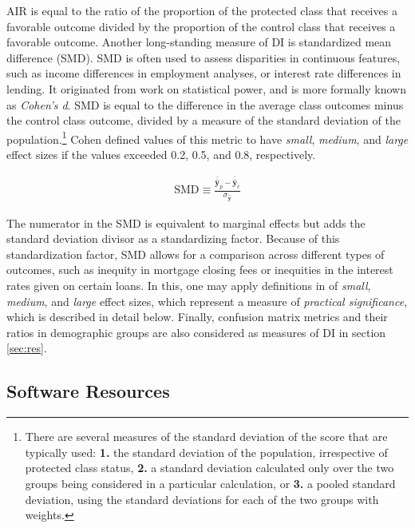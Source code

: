 \documentclass[information,article,submit,moreauthors,pdftex]{definitions/mdpi}
\begin{document}
\noindent AIR is equal to the ratio of the proportion of the protected class that receives a favorable outcome divided by the proportion of the control class that receives a favorable outcome.  Another long-standing measure of DI is standardized mean difference (SMD). SMD is often used to assess disparities in continuous features, such as income differences in employment analyses, or interest rate differences in lending. It originated from work on statistical power, and is more formally known as \textit{Cohen’s d}. SMD is equal to the difference in the average class outcomes minus the control class outcome, divided by a measure of the standard deviation of the population.\footnote{There are several measures of the standard deviation of the score that are typically used: \textbf{1.} the standard deviation of the population, irrespective of protected class status, \textbf{2.} a standard deviation calculated only over the two groups being considered in a particular calculation, or \textbf{3.} a pooled standard deviation, using the standard deviations for each of the two groups with weights.} Cohen defined values of this metric to have \textit{small}, \textit{medium}, and \textit{large} effect sizes if the values exceeded 0.2, 0.5, and 0.8, respectively.  

\begin{equation}
\label{eq:smd}
\begin{aligned}
\text{SMD} \equiv \frac{\bar{\hat{\mathbf{y}}}_p - \bar{\hat{\mathbf{y}}}_c}{ \sigma_{\hat{\mathbf{y}}}}
\end{aligned}
\end{equation}

\noindent The numerator in the SMD is equivalent to marginal effects but adds the standard deviation divisor as a standardizing factor.  Because of this standardization factor, SMD allows for a comparison across different types of outcomes, such as inequity in mortgage closing fees or inequities in the interest rates given on certain loans.  In this, one may apply definitions in \citet{cohen1988statistical} of \textit{small}, \textit{medium}, and \textit{large} effect sizes, which represent a measure of \textit{practical significance}, which is described in detail below.  Finally, confusion matrix metrics and their ratios in demographic groups are also considered as measures of DI in section \ref{sec:res}.

\subsection{Software Resources}\label{ssec:soft}
\end{document}
